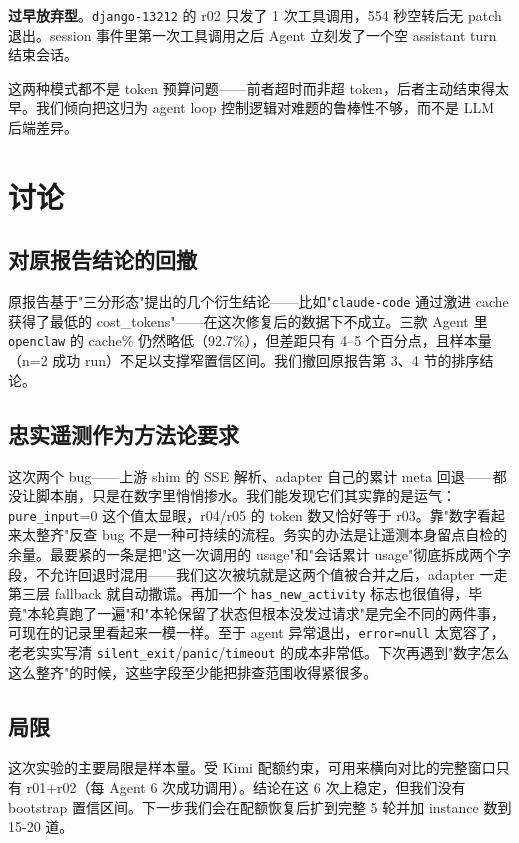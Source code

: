 \documentclass[11pt,a4paper]{article}
\begin{document}
\textbf{过早放弃型}。\texttt{django-13212} 的 r02 只发了 1 次工具调用，554 秒空转后无 patch 退出。session 事件里第一次工具调用之后 Agent 立刻发了一个空 assistant turn 结束会话。

这两种模式都不是 token 预算问题——前者超时而非超 token，后者主动结束得太早。我们倾向把这归为 agent loop 控制逻辑对难题的鲁棒性不够，而不是 LLM 后端差异。

\section{讨论}

\subsection{对原报告结论的回撤}
原报告基于"三分形态"提出的几个衍生结论——比如"\texttt{claude-code} 通过激进 cache 获得了最低的 cost\_tokens"——在这次修复后的数据下不成立。三款 Agent 里 \texttt{openclaw} 的 cache\% 仍然略低（92.7\%），但差距只有 4--5 个百分点，且样本量（n=2 成功 run）不足以支撑窄置信区间。我们撤回原报告第 3、4 节的排序结论。

\subsection{忠实遥测作为方法论要求}
这次两个 bug——上游 shim 的 SSE 解析、adapter 自己的累计 meta 回退——都没让脚本崩，只是在数字里悄悄掺水。我们能发现它们其实靠的是运气：\texttt{pure\_input}=0 这个值太显眼，r04/r05 的 token 数又恰好等于 r03。靠"数字看起来太整齐"反查 bug 不是一种可持续的流程。务实的办法是让遥测本身留点自检的余量。最要紧的一条是把"这一次调用的 usage"和"会话累计 usage"彻底拆成两个字段，不允许回退时混用——我们这次被坑就是这两个值被合并之后，adapter 一走第三层 fallback 就自动撒谎。再加一个 \texttt{has\_new\_activity} 标志也很值得，毕竟"本轮真跑了一遍"和"本轮保留了状态但根本没发过请求"是完全不同的两件事，可现在的记录里看起来一模一样。至于 agent 异常退出，\texttt{error=null} 太宽容了，老老实实写清 \texttt{silent\_exit}/\texttt{panic}/\texttt{timeout} 的成本非常低。下次再遇到"数字怎么这么整齐"的时候，这些字段至少能把排查范围收得紧很多。

\subsection{局限}
这次实验的主要局限是样本量。受 Kimi 配额约束，可用来横向对比的完整窗口只有 r01+r02（每 Agent 6 次成功调用）。结论在这 6 次上稳定，但我们没有 bootstrap 置信区间。下一步我们会在配额恢复后扩到完整 5 轮并加 instance 数到 15-20 道。
\end{document}
